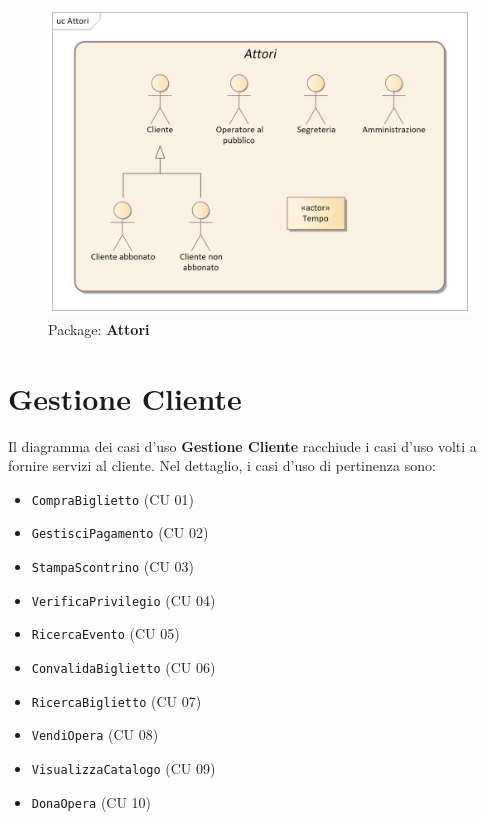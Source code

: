 \documentclass{article}
\begin{document}
\begin{figure}[h]
    \centering
    \includegraphics[width=1\textwidth]{Attori}
    \caption{Package: \textbf{Attori}}
    \label{fig:Attori}
\end{figure}












\newpage

\section{Gestione Cliente}

\indent\indent Il diagramma dei casi d'uso \textbf{Gestione Cliente} racchiude i casi d'uso volti a fornire servizi al cliente. Nel dettaglio, i casi d'uso di pertinenza sono:

\medskip
\begin{itemize}[itemsep=0pt]
  \item \texttt{CompraBiglietto} (CU 01)
  \item \texttt{GestisciPagamento} (CU 02)
  \item \texttt{StampaScontrino} (CU 03)
  \item \texttt{VerificaPrivilegio} (CU 04)
  \item \texttt{RicercaEvento} (CU 05)
  \item \texttt{ConvalidaBiglietto} (CU 06)
  \item \texttt{RicercaBiglietto} (CU 07)
  \item \texttt{VendiOpera} (CU 08)
  \item \texttt{VisualizzaCatalogo} (CU 09)
  \item \texttt{DonaOpera} (CU 10)
\end{itemize}
\end{document}
